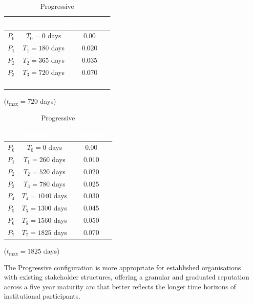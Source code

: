 \documentclass[a4paper,12pt]{article}
\begin{document}
\begin{table}[h]
\centering
\begin{minipage}{0.45\textwidth}
\centering
\begin{tabular}{|c|c|c|}
\hline
\rowcolor{gray!100}\textcolor{white}{\textbf{$P_n$}} & \textcolor{white}{\textbf{Tranche ($T_n$)}} & \textcolor{white}{\textbf{Multiplier}} \\ \hline
$P_0$ & $T_0 = 0$ days & 0.00 \\ \hline
$P_1$ & $T_1 = 180$ days & 0.020 \\ \hline
$P_2$ & $T_2 = 365$ days & 0.035\\ \hline
$P_3$ & $T_3 = 720$ days & 0.070 \\ \hline
& &  \\ \hline
& &  \\ \hline
& & \\ \hline
& & \\ \hline
\end{tabular}
\caption{Agile}
($t_{\text{max}} = 720$ days)
\end{minipage}
\hfill
\begin{minipage}{0.45\textwidth}
\centering
\begin{tabular}{|c|c|c|}
\hline
\rowcolor{gray!100}\textcolor{white}{\textbf{$P_n$}} & \textcolor{white}{\textbf{Tranche ($T_n$)}} & \textcolor{white}{\textbf{Multiplier}} \\ \hline
$P_0$ & $T_0 = 0$ days & 0.00 \\ \hline
$P_1$ & $T_1 = 260$ days & 0.010 \\ \hline
$P_2$ & $T_2 = 520$ days & 0.020 \\ \hline
$P_3$ & $T_3 = 780$  days & 0.025 \\ \hline
$P_4$ & $T_4 = 1040$ days & 0.030 \\ \hline
$P_5$ & $T_5 = 1300$ days & 0.045 \\ \hline
$P_6$ & $T_6 = 1560$ days & 0.050 \\ \hline
$P_7$ & $T_7 = 1825$ days & 0.070 \\ \hline
\end{tabular}
\caption{Progressive}
($t_{\text{max}} = 1825$ days)
\end{minipage}
\end{table}

The Progressive configuration is more appropriate for established organisations with existing stakeholder structures, offering a granular and graduated reputation across a five year maturity arc that better reflects the longer time horizons of institutional participants.
\end{document}
